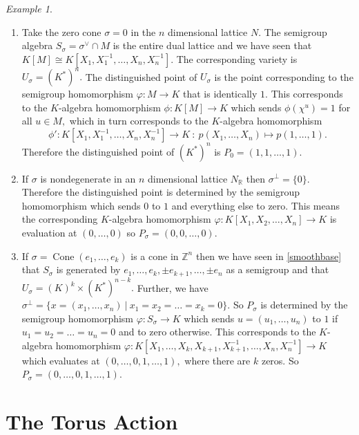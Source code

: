 \documentclass[BSc]{usydthesis}
\numberwithin{equation}{chapter}
\theoremstyle{remark}
\newtheorem{Example}[equation]{Example}
\newcommand{\R}{\mathbb{R}}
\newcommand{\Z}{\mathbb{Z}}
\newcommand{\V}{\vee}
\DeclareMathOperator{\Cone}{Cone}
\begin{document}
\begin{Example}\label{DistinguishedPointsExamples}
~
\begin{enumerate}
  \item Take the zero cone $\sigma = 0$ in the $n$ dimensional lattice $N.$ The semigroup algebra $S_{\sigma} = \sigma^{\V}\cap M$ is the entire dual lattice and we have seen that $K[M] \cong K[X_1,X_1^{-1},\ldots, X_n, X_n^{-1}].$ The corresponding variety is $U_{\sigma} = (K^*)^n.$  The distinguished point of $U_{\sigma}$ is the point corresponding to the semigroup homomorphism $\varphi: M \to K$ that is identically $1.$ This corresponds to the $K$-algebra homomorphism $\phi: K[M] \to K$ which sends $\phi(\chi^u) =1$ for all $u\in M,$ which in turn corresponds to the $K$-algebra homomorphism $$\phi': K[X_1, X_1^{-1}, \ldots, X_n, X_n^{-1}] \to K \ : \ p(X_1,\ldots, X_n) \mapsto p(1,\ldots, 1) .$$ Therefore the distinguished point of $(K^*)^n$ is $P_{0} = (1,1,\ldots, 1).$
  
  \item If $\sigma$ is nondegenerate in an $n$ dimensional lattice $N_{\R}$ then $\sigma^{\perp} = \{ 0\}.$ Therefore the distinguished point is determined by the semigroup homomorphism which sends $0$ to $1$ and everything else to zero. This means the corresponding $K$-algebra homomorphism $\varphi:K[X_1,X_2,\ldots, X_n]\to K$ is evaluation at $(0,\ldots, 0)$ so $P_{\sigma} = (0,0,\ldots, 0).$
  
  \item  If $\sigma = \Cone(e_1, \ldots, e_k)$ is a cone in $\Z^n$ then we have seen in \ref{smoothbase} that $S_{\sigma}$ is generated by $e_1,\ldots, e_k, \pm e_{k+1}, \ldots, \pm e_n$ as a semigroup and that $U_{\sigma} = (K)^k \times (K^*)^{n-k}.$ Further, we have $\sigma^{\perp} = \{ x= (x_1,\ldots, x_n) \ | \ x_1=x_2=\ldots=x_k=0 \}.$ So $P_{\sigma}$ is determined by the semigroup homomorphism $\varphi: S_{\sigma} \to K$ which sends $u=(u_1, \ldots, u_n)$ to $1$ if $u_1=u_2=\ldots = u_n=0$ and to zero otherwise. This corresponds to the $K$-algebra homomorphism $\varphi: K[X_1, \ldots, X_k, X_{k+1}, X_{k+1}^{-1}, \ldots, X_n, X_n^{-1}] \to K$ which evaluates at $(0,\ldots, 0, 1,\ldots, 1), $ where there are $k$ zeros. So $P_{\sigma} = (0,\ldots, 0, 1,\ldots, 1).$ 
 \end{enumerate}

\end{Example}


\section{The Torus Action}
\end{document}
